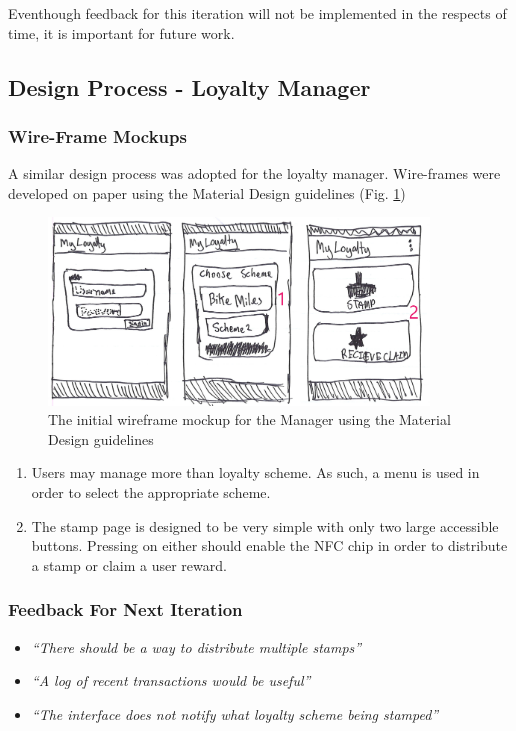 Eventhough feedback for this iteration will not be implemented in the respects of time, it is important for future work.

\newpage
\subsection{Design Process - Loyalty Manager}
\subsubsection{Wire-Frame Mockups}
A similar design process was adopted for the loyalty manager. Wire-frames were developed on paper using the Material Design guidelines (Fig. \ref{fig:wireframem1}) 
\begin{figure}[H]
 \centering
  \includegraphics[width=0.9\textwidth]{img/Page2.jpg}
    \caption{The initial wireframe mockup for the Manager using the Material Design guidelines}
         \label{fig:wireframem1}
\end{figure}


\begin{enumerate}
  \item Users may manage more than loyalty scheme. As such, a menu is used in order to select the appropriate scheme.
  \item The stamp page is designed to be very simple with only two large accessible buttons. Pressing on either should enable the NFC chip in order to distribute a stamp or claim a user reward.
\end{enumerate}

\subsubsection{Feedback For Next Iteration}
\begin{itemize}
  \item \textit{``There should be a way to distribute multiple stamps''}
  \item \textit{``A log of recent transactions would be useful''}
  \item \textit{``The interface does not notify what loyalty scheme being stamped''}
\end{itemize}

